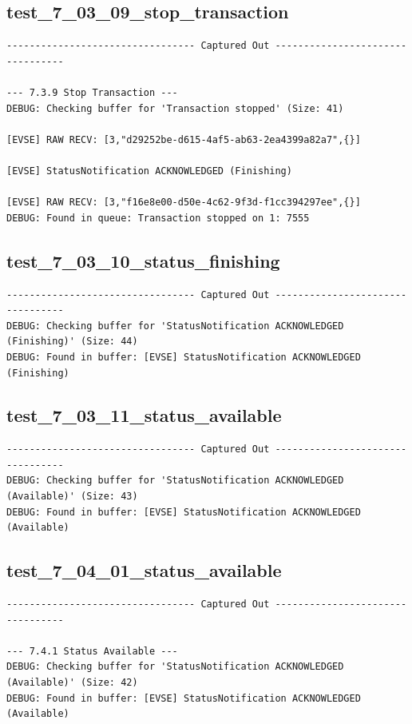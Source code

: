 \documentclass{article}
\begin{document}
\subsection*{test\_7\_03\_09\_stop\_transaction}
\begin{lstlisting}
--------------------------------- Captured Out ---------------------------------

--- 7.3.9 Stop Transaction ---
DEBUG: Checking buffer for 'Transaction stopped' (Size: 41)

[EVSE] RAW RECV: [3,"d29252be-d615-4af5-ab63-2ea4399a82a7",{}]

[EVSE] StatusNotification ACKNOWLEDGED (Finishing)

[EVSE] RAW RECV: [3,"f16e8e00-d50e-4c62-9f3d-f1cc394297ee",{}]
DEBUG: Found in queue: Transaction stopped on 1: 7555
\end{lstlisting}
\subsection*{test\_7\_03\_10\_status\_finishing}
\begin{lstlisting}
--------------------------------- Captured Out ---------------------------------
DEBUG: Checking buffer for 'StatusNotification ACKNOWLEDGED (Finishing)' (Size: 44)
DEBUG: Found in buffer: [EVSE] StatusNotification ACKNOWLEDGED (Finishing)
\end{lstlisting}
\subsection*{test\_7\_03\_11\_status\_available}
\begin{lstlisting}
--------------------------------- Captured Out ---------------------------------
DEBUG: Checking buffer for 'StatusNotification ACKNOWLEDGED (Available)' (Size: 43)
DEBUG: Found in buffer: [EVSE] StatusNotification ACKNOWLEDGED (Available)
\end{lstlisting}
\subsection*{test\_7\_04\_01\_status\_available}
\begin{lstlisting}
--------------------------------- Captured Out ---------------------------------

--- 7.4.1 Status Available ---
DEBUG: Checking buffer for 'StatusNotification ACKNOWLEDGED (Available)' (Size: 42)
DEBUG: Found in buffer: [EVSE] StatusNotification ACKNOWLEDGED (Available)
\end{lstlisting}
\end{document}

